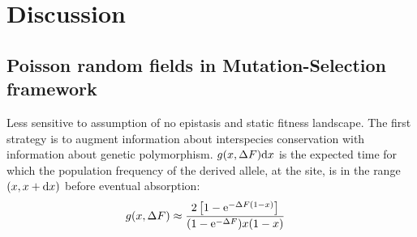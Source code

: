 \chapter{Discussion}
\minitoc

\section{Poisson random fields in Mutation-Selection framework}
Less sensitive to assumption of no epistasis and static fitness landscape.
The first strategy is to augment information about interspecies conservation with information about genetic polymorphism.
$g(x, {\Delta F}) \mathrm{d} x $ is the expected time for which the population frequency of the derived allele, at the site, is in the range $(x, x+\mathrm{d} x)$ before eventual absorption:
\begin{align}
g(x, {\Delta F}) & \approx \dfrac{2 \left[ 1 - \mathrm{e}^{-{\Delta F} (1-x)}\right]}{(1 - \mathrm{e}^{-{\Delta F}})x(1-x)}
\end{align}


